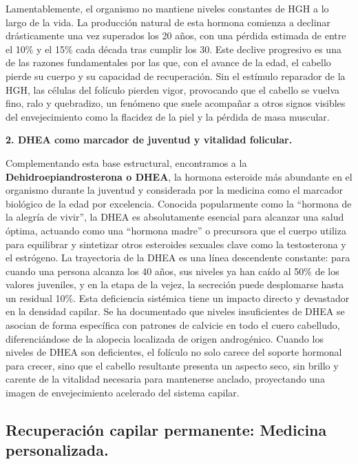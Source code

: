 \documentclass[
  spanish,
]{article}
\begin{document}
Lamentablemente, el organismo no mantiene niveles constantes de HGH a lo largo de la vida. La producción natural de esta hormona comienza a declinar drásticamente una vez superados los 20 años, con una pérdida estimada de entre el 10\% y el 15\% cada década tras cumplir los 30. Este declive progresivo es una de las razones fundamentales por las que, con el avance de la edad, el cabello pierde su cuerpo y su capacidad de recuperación. Sin el estímulo reparador de la HGH, las células del folículo pierden vigor, provocando que el cabello se vuelva fino, ralo y quebradizo, un fenómeno que suele acompañar a otros signos visibles del envejecimiento como la flacidez de la piel y la pérdida de masa muscular.

\textbf{2. DHEA como marcador de juventud y vitalidad folicular.}

Complementando esta base estructural, encontramos a la \textbf{Dehidroepiandrosterona o DHEA}, la hormona esteroide más abundante en el organismo durante la juventud y considerada por la medicina como el marcador biológico de la edad por excelencia. Conocida popularmente como la ``hormona de la alegría de vivir'', la DHEA es absolutamente esencial para alcanzar una salud óptima, actuando como una ``hormona madre'' o precursora que el cuerpo utiliza para equilibrar y sintetizar otros esteroides sexuales clave como la testosterona y el estrógeno.
La trayectoria de la DHEA es una línea descendente constante: para cuando una persona alcanza los 40 años, sus niveles ya han caído al 50\% de los valores juveniles, y en la etapa de la vejez, la secreción puede desplomarse hasta un residual 10\%. Esta deficiencia sistémica tiene un impacto directo y devastador en la densidad capilar. Se ha documentado que niveles insuficientes de DHEA se asocian de forma específica con patrones de calvicie en todo el cuero cabelludo, diferenciándose de la alopecia localizada de origen androgénico. Cuando los niveles de DHEA son deficientes, el folículo no solo carece del soporte hormonal para crecer, sino que el cabello resultante presenta un aspecto seco, sin brillo y carente de la vitalidad necesaria para mantenerse anclado, proyectando una imagen de envejecimiento acelerado del sistema capilar.

\subsection{Recuperación capilar permanente: Medicina personalizada.}\label{recuperaciuxf3n-capilar-permanente-medicina-personalizada.}
\end{document}
